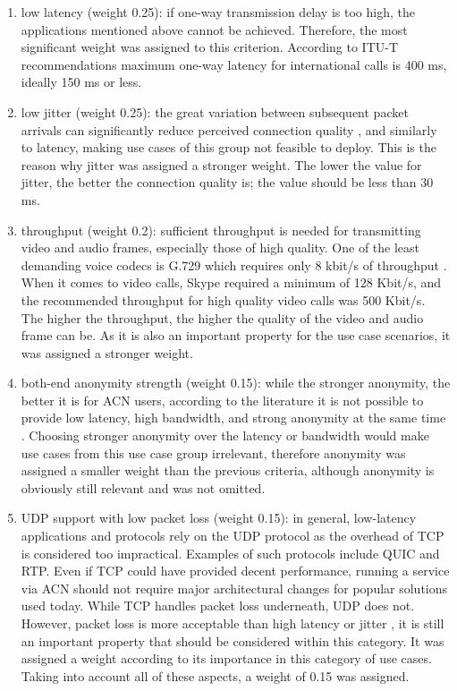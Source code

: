 \begin{enumerate}
    \item low latency (weight 0.25): if one-way transmission delay is too high, the applications mentioned above cannot be achieved. Therefore, the most significant weight was assigned to this criterion. According to ITU-T recommendations \cite{ITU-G.114} maximum one-way latency for international calls is 400 ms, ideally 150 ms or less.
    \item low jitter (weight 0.25): the great variation between subsequent packet arrivals can significantly reduce perceived connection quality \cite{voip-tor}, and similarly to latency,  making use cases of this group not feasible to deploy. This is the reason why jitter was assigned a stronger weight. The lower the value for jitter, the better the connection quality is; the value should be less than 30 ms.
    \item throughput (weight 0.2): sufficient throughput is needed for transmitting video and audio frames, especially those of high quality. One of the least demanding voice codecs is G.729 which requires only 8 kbit/s of throughput \cite{ITU-G.729}. When it comes to video calls, Skype required \cite{microsoft-skype-bandwidth} a minimum of 128 Kbit/s, and the recommended throughput for high quality video calls was 500 Kbit/s. The higher the throughput, the higher the quality of the video and audio frame can be. As it is also an important property for the use case scenarios, it was assigned a stronger weight.
    \item both-end anonymity strength (weight 0.15): while the stronger anonymity, the better it is for ACN users, according to the literature it is not possible to provide low latency, high bandwidth, and strong anonymity at the same time \cite{anonymity-trillema}. Choosing stronger anonymity over the latency or bandwidth would make use cases from this use case group irrelevant, therefore anonymity was assigned a smaller weight than the previous criteria, although anonymity is obviously still relevant and was not omitted.
    \item UDP support with low packet loss (weight 0.15): in general, low-latency applications and protocols rely on the UDP protocol as the overhead of TCP is considered too impractical. Examples of such protocols include QUIC and RTP. Even if TCP could have provided decent performance, running a service via ACN should not require major architectural changes for popular solutions used today. While TCP handles packet loss underneath, UDP does not. However, packet loss is more acceptable than high latency or jitter \cite{voip-tor}, it is still an important property that should be considered within this category. It was assigned a weight according to its importance in this category of use cases.  Taking into account all of these aspects, a weight of 0.15 was assigned.
\end{enumerate}

